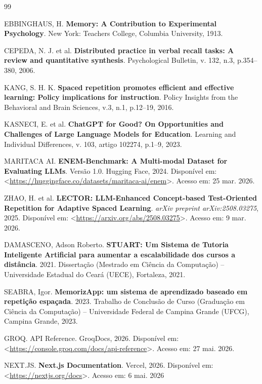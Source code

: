 \documentclass[
12pt,
openright,
oneside,
a4paper,
brazil
]{abntex2}
\begin{document}
\begin{thebibliography}{99}

EBBINGHAUS, H. \textbf{Memory: A Contribution to Experimental Psychology}. New York: Teachers College, Columbia University, 1913.

CEPEDA, N. J. et al. \textbf{Distributed practice in verbal recall tasks: A review and quantitative synthesis}. Psychological Bulletin, v. 132, n.3, p.354–380, 2006.

KANG, S. H. K. \textbf{Spaced repetition promotes efficient and effective learning: Policy implications for instruction}. Policy Insights from the Behavioral and Brain Sciences, v.3, n.1, p.12–19, 2016.

KASNECI, E. et al. \textbf{ChatGPT for Good? On Opportunities and Challenges of Large Language Models for Education}. Learning and Individual Differences, v. 103, artigo 102274, p.1--9, 2023.

MARITACA AI. \textbf{ENEM-Benchmark: A Multi-modal Dataset for Evaluating LLMs}. Versão 1.0. Hugging Face, 2024. Disponível em: <\url{https://huggingface.co/datasets/maritaca-ai/enem}>. Acesso em: 25 mar. 2026.

ZHAO, H. et al. \textbf{LECTOR: LLM-Enhanced Concept-based Test-Oriented Repetition for Adaptive Spaced Learning}. \textit{arXiv preprint arXiv:2508.03275}, 2025. Disponível em: <\url{https://arxiv.org/abs/2508.03275}>. Acesso em: 9 mar. 2026.

DAMASCENO, Adson Roberto. \textbf{STUART: Um Sistema de Tutoria Inteligente Artificial para aumentar a escalabilidade dos cursos a distância}. 2021. Dissertação (Mestrado em Ciência da Computação) -- Universidade Estadual do Ceará (UECE), Fortaleza, 2021.

SEABRA, Igor. \textbf{MemorizApp: um sistema de aprendizado baseado em repetição espaçada}. 2023. Trabalho de Conclusão de Curso (Graduação em Ciência da Computação) -- Universidade Federal de Campina Grande (UFCG), Campina Grande, 2023.

GROQ. API Reference. GroqDocs, 2026. Disponível em: <\url{https://console.groq.com/docs/api-reference}>. Acesso em: 27 mai. 2026.

NEXT.JS. \textbf{Next.js Documentation}. Vercel, 2026. Disponível em: <\url{https://nextjs.org/docs}>. Acesso em: 6 mai. 2026


\end{thebibliography}
\end{document}
